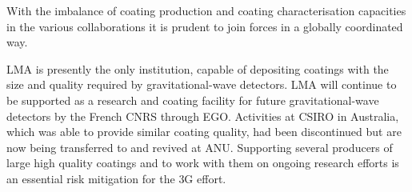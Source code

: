 With the imbalance of coating production and coating characterisation capacities in the various collaborations it is prudent to join forces in a globally coordinated way. 

\ac{LMA} is presently the only institution, capable of depositing coatings with the size and quality required by gravitational-wave detectors. \ac{LMA} will continue to be supported as a research and coating facility for future gravitational-wave detectors by the French \ac{CNRS} through EGO. Activities at \ac{CSIRO} in Australia, which was able to provide similar coating quality, had been discontinued but are now being transferred to and revived at \ac{ANU}. Supporting several producers of large high quality coatings and to work with them on ongoing research efforts is an essential risk mitigation for the \ac{3G} effort.







